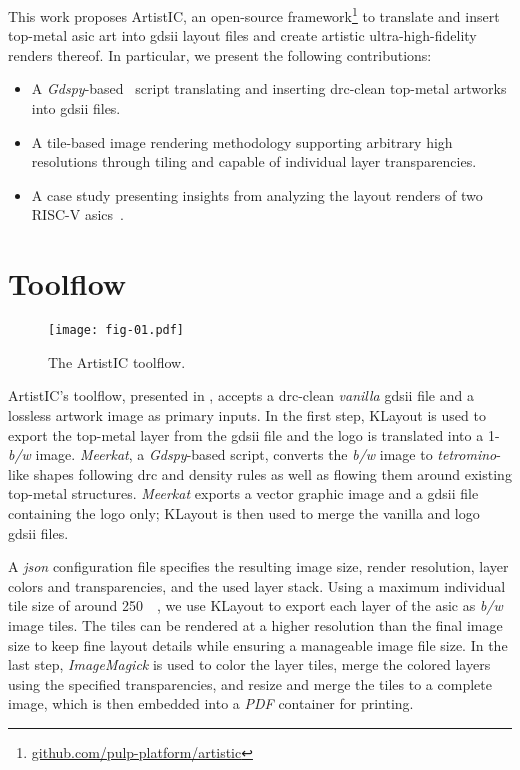 \documentclass[a4paper, 10pt, unnumberedsections, twoside]{LTJournalArticle}
\newcommand{\riscv}{\mbox{RISC-V}}
\newcommand{\artistic}{ArtistIC}
\newcommand{\klayout}{KLayout}
\newcommand{\imagemagick}{ImageMagick}
\begin{document}
%
This work proposes {\artistic}, an open-source framework\footnote{\url{github.com/pulp-platform/artistic}} to translate and insert top-metal \gls{asic} art into \gls{gdsii} layout files and create artistic ultra-high-fidelity renders thereof.
%
In particular, we present the following contributions:
\begin{itemize}
    \item A \emph{Gdspy}-based~\cite{2024gdspy} script translating and inserting \gls{drc}-clean top-metal artworks into \gls{gdsii} files.
    \item A tile-based image rendering methodology supporting arbitrary high resolutions through tiling and capable of individual layer transparencies.
    \item A case study presenting insights from analyzing the layout renders of two {\riscv} \glspl{asic}~\cite{sauter2024insights, scheffler2025occamy}.
\end{itemize}



\section{Toolflow}

\begin{figure}
\centering%
    \texttt{[image: fig-01.pdf]}%
    \caption{The {\artistic} toolflow.}
    \label{fig:toolflow}
\end{figure}

{\artistic}'s toolflow, presented in , accepts a \gls{drc}-clean \emph{vanilla} \gls{gdsii} file and a lossless artwork image as primary inputs.
In the first step, {\klayout} is used to export the top-metal layer from the \gls{gdsii} file and the logo is translated into a 1-\si{\bit} \emph{b/w} image.
\emph{Meerkat}, a \emph{Gdspy}-based script, converts the \emph{b/w} image to \emph{tetromino}-like shapes following \gls{drc} and density rules as well as flowing them around existing top-metal structures.
\emph{Meerkat} exports a vector graphic image and a \gls{gdsii} file containing the logo only; {\klayout} is then used to merge the vanilla and logo \gls{gdsii} files.

A \emph{json} configuration file specifies the resulting image size, render resolution, layer colors and transparencies, and the used layer stack. 
Using a maximum individual tile size of around \SI{250}{\mega\pixel}, we use {\klayout} to export each layer of the \gls{asic} as \emph{b/w} image tiles.
The tiles can be rendered at a higher resolution than the final image size to keep fine layout details while ensuring a manageable image file size. 
In the last step, \emph{\imagemagick} is used to color the layer tiles, merge the colored layers using the specified transparencies, and resize and merge the tiles to a complete image, which is then embedded into a \emph{PDF} container for printing.
\end{document}

